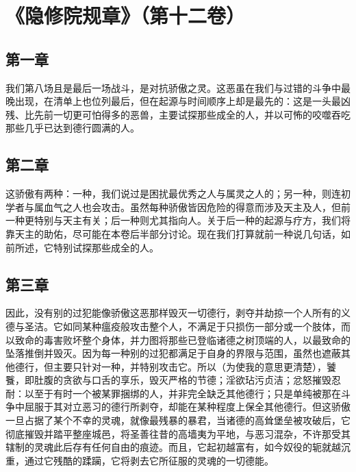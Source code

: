 \section{《隐修院规章》（第十二卷）}


\subsection{第一章}

\par

我们第八场且是最后一场战斗，是对抗骄傲之灵。这恶虽在我们与过错的斗争中最晚出现，在清单上也位列最后，但在起源与时间顺序上却是最先的：这是一头最凶残、比先前一切更可怕得多的恶兽，主要试探那些成全的人，并以可怖的咬噬吞吃那些几乎已达到德行圆满的人。\par


\subsection{第二章}

\par

这骄傲有两种：一种，我们说过是困扰最优秀之人与属灵之人的；另一种，则连初学者与属血气之人也会攻击。虽然每种骄傲皆因危险的得意而涉及天主及人，但前一种更特别与天主有关；后一种则尤其指向人。关于后一种的起源与疗方，我们将靠天主的助佑，尽可能在本卷后半部分讨论。现在我们打算就前一种说几句话，如前所述，它特别试探那些成全的人。\par


\subsection{第三章}

\par

因此，没有别的过犯能像骄傲这恶那样毁灭一切德行，剥夺并劫掠一个人所有的义德与圣洁。它如同某种瘟疫般攻击整个人，不满足于只损伤一部分或一个肢体，而以致命的毒害败坏整个身体，并力图将那些已登临诸德之树顶端的人，以最致命的坠落推倒并毁灭。因为每一种别的过犯都满足于自身的界限与范围，虽然也遮蔽其他德行，但主要只针对一种，并特别攻击它。所以（为使我的意思更清楚），饕餮，即肚腹的贪欲与口舌的享乐，毁灭严格的节德；淫欲玷污贞洁；忿怒摧毁忍耐：以至于有时一个被某罪捆绑的人，并非完全缺乏其他德行；只是单纯被那在斗争中屈服于其对立恶习的德行所剥夺，却能在某种程度上保全其他德行。但这骄傲一旦占据了某个不幸的灵魂，就像最残暴的暴君，当诸德的高耸堡垒被攻破后，它彻底摧毁并踏平整座城邑，将圣善往昔的高墙夷为平地，与恶习混杂，不许那受其辖制的灵魂此后存有任何自由的痕迹。而且，它起初越富有，如今奴役的轭就越沉重，通过它残酷的蹂躏，它将剥去它所征服的灵魂的一切德能。\par

